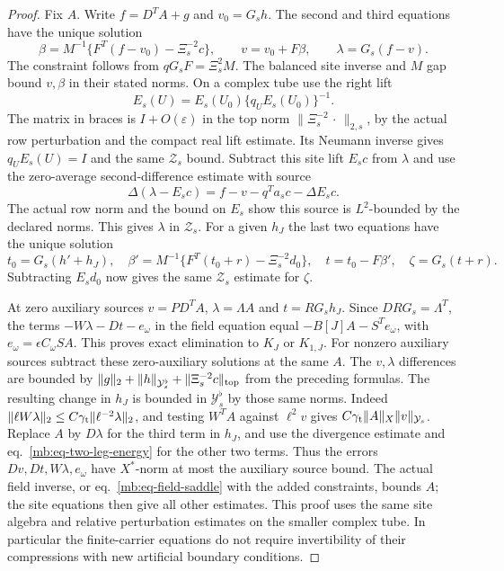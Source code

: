 \documentclass[11pt,letterpaper,reqno]{amsart}
\numberwithin{equation}{section}
\renewcommand{\eqref}[1]{\textup{eq.~\ref{#1}}}
\theoremstyle{definition}
\theoremstyle{remark}
\begin{document}
\begin{proof}
Fix \(A\). Write \(f=D^TA+g\) and \(v_0=G_sh\). The second and third equations have the unique solution
\[
 \beta=M^{-1}\{F^T(f-v_0)-\Xi_s^{-2}c\},
 \qquad v=v_0+F\beta,\qquad \lambda=G_s(f-v).
\]
The constraint follows from \(qG_sF=\Xi_s^2 M\). The balanced site inverse and \(M\) gap bound \(v,\beta\) in their stated norms. On a complex tube use the right lift
\[
 E_s(U)=E_s(U_0)\{q_U E_s(U_0)\}^{-1}.
\]
The matrix in braces is $I+O(\varepsilon)$ in the top norm
$\|\Xi_s^{-2}\,\cdot\,\|_{2,s}$, by the actual row
perturbation and the compact real lift estimate. Its Neumann
inverse gives $q_UE_s(U)=I$ and the same $\mathcal Z_s$
bound. Subtract this site lift \(E_sc\) from \(\lambda\) and use the zero-average second-difference estimate with source
\[
       \Delta(\lambda-E_sc)=f-v-q^Ta_sc-\Delta E_sc.
\]
The actual row norm and the bound on \(E_s\) show this source is \(L^2\)-bounded by the declared norms. This gives \(\lambda\) in \(\mathcal Z_s\). For a given \(h_J\) the last two equations have the unique solution
\[
 t_0=G_s(h'+h_J),\quad
 \beta'=M^{-1}\{F^T(t_0+r)-\Xi_s^{-2}d_0\},\quad
 t=t_0-F\beta',\quad \zeta=G_s(t+r).
\]
Subtracting \(E_sd_0\) now gives the same \(\mathcal Z_s\) estimate for \(\zeta\).

At zero auxiliary sources \(v=PD^TA\), \(\lambda=\Lambda A\) and \(t=RG_s h_J\). Since \(DRG_s=\Lambda^T\), the terms \(-W\lambda-Dt-e_\omega\) in the field equation equal \(-B[J]A-S^T e_\omega\), with \(e_\omega=\epsilon C_\omega SA\). This proves exact elimination to \(K_J\) or \(K_{1,J}\). For nonzero auxiliary sources subtract these zero-auxiliary solutions at the same \(A\). The \(v,\lambda\) differences are bounded by \(\|g\|_2+\|h\|_{\mathcal Y_s^\flat}+\|\Xi_s^{-2}c\|_{\rm top}\) from the preceding formulas. The resulting change in \(h_J\) is bounded in \(\mathcal Y_s^\flat\) by those same norms. Indeed \(\|\ell W\lambda\|_2\le C\gamma_{\rm t}\|\ell^{-2}\lambda\|_2\), and testing \(W^TA\) against \(\ell^2v\) gives \(C\gamma_{\rm t}\|A\|_X\|v\|_{\mathcal Y_s}\). Replace \(A\) by \(D\lambda\) for the third term in \(h_J\), and use the divergence estimate and \eqref{mb:eq-two-leg-energy} for the other two terms. Thus the errors \(Dv,Dt,W\lambda,e_\omega\) have \(X^*\)-norm at most the auxiliary source bound. The actual field inverse, or \eqref{mb:eq-field-saddle} with the added constraints, bounds \(A\); the site equations then give all other estimates. This proof uses the same site algebra and relative perturbation estimates on the smaller complex tube. In particular the finite-carrier equations do not require invertibility of their compressions with new artificial boundary conditions.
\end{proof}
\end{document}

